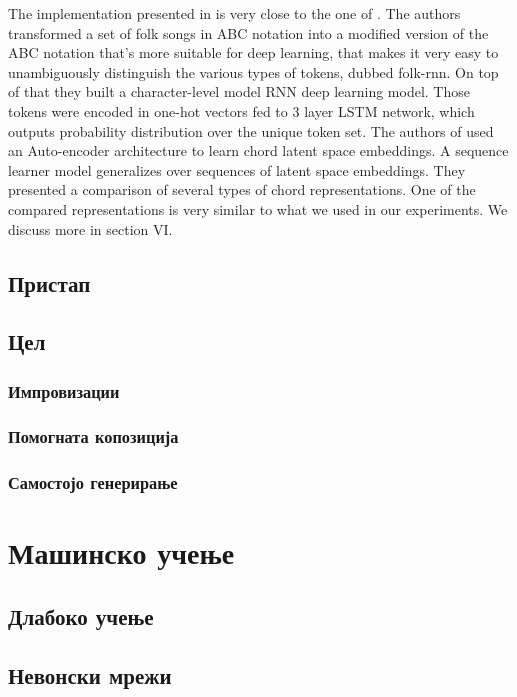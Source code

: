 The implementation presented in \cite{Sturm2015} is very close to the one of \cite{AndrejKarpathy2015}. The authors transformed a set of folk songs in ABC notation into a modified version of the ABC notation that's more suitable for deep learning, that makes it very easy to unambiguously distinguish the various types of tokens, dubbed folk-rnn. On top of that they built a character-level model RNN deep learning model. Those tokens were encoded in one-hot vectors fed to 3 layer LSTM network, which outputs probability distribution over the unique token set. 
The authors of \cite{Madjiheurem2016} used an Auto-encoder architecture to learn chord latent space embeddings. A sequence learner model generalizes over sequences of latent space embeddings. They presented a comparison of several types of chord representations. One of the compared representations is very similar to what we used in our experiments. We discuss more in section VI.

\section{Пристап}


\section{Цел}



\subsection{Импровизации} 
\subsection{Помогната копозиција} 
\subsection{Самостојо генерирање} 

\chapter{Машинско учење}

\section{Длабоко учење}

\section{Невонски мрежи}

